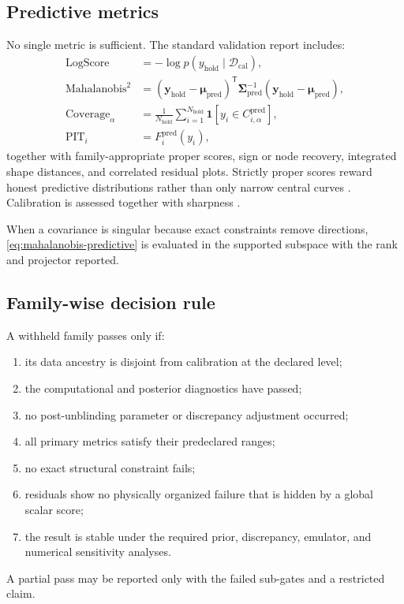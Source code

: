 \documentclass[11pt]{article}
\newcommand{\bbone}{\bm 1}
\newcommand{\caldata}{\mathcal D_{\mathrm{cal}}}
\newcommand{\pred}{\mathrm{pred}}
\newcommand{\hold}{\mathrm{hold}}
\begin{document}
\subsection{Predictive metrics}

No single metric is sufficient.  The standard validation report includes:
\begin{align}
 \mathrm{LogScore}
 &=
 -\log p(y_{\hold}\mid\caldata),
 \label{eq:log-score}\\
 \mathrm{Mahalanobis}^2
 &=
 (\bm y_{\hold}-\bm\mu_{\pred})^{\mathsf T}
 \bm\Sigma_{\pred}^{-1}
 (\bm y_{\hold}-\bm\mu_{\pred}),
 \label{eq:mahalanobis-predictive}\\
 \mathrm{Coverage}_{\alpha}
 &=
 \frac{1}{N_{\hold}}
 \sum_{i=1}^{N_{\hold}}
 \bbone[
 y_i\in C_{i,\alpha}^{\pred}
 ],
 \label{eq:predictive-coverage}\\
 \mathrm{PIT}_i
 &=
 F_i^{\pred}(y_i),
 \label{eq:pit}
\end{align}
together with family-appropriate proper scores, sign or node recovery,
integrated shape distances, and correlated residual plots.  Strictly proper
scores reward honest predictive distributions rather than only narrow central
curves \cite{GneitingRaftery2007}.  Calibration is assessed together with
sharpness \cite{GneitingCalibration2007}.

When a covariance is singular because exact constraints remove directions,
\cref{eq:mahalanobis-predictive} is evaluated in the supported subspace with
the rank and projector reported.

\subsection{Family-wise decision rule}

A withheld family passes only if:
\begin{enumerate}
\item its data ancestry is disjoint from calibration at the declared level;
\item the computational and posterior diagnostics have passed;
\item no post-unblinding parameter or discrepancy adjustment occurred;
\item all primary metrics satisfy their predeclared ranges;
\item no exact structural constraint fails;
\item residuals show no physically organized failure that is hidden by a
global scalar score;
\item the result is stable under the required prior, discrepancy, emulator,
and numerical sensitivity analyses.
\end{enumerate}
A partial pass may be reported only with the failed sub-gates and a restricted
claim.
\end{document}
